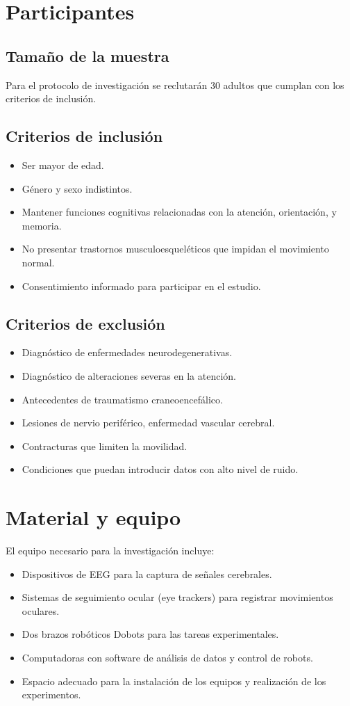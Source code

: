 \documentclass[12pt]{article}
\begin{document}
\section{Participantes}

\subsection{Tamaño de la muestra}
Para el protocolo de investigación se reclutarán 30 adultos que cumplan con los 
criterios de inclusión.

\subsection{Criterios de inclusión}
\begin{itemize}
    \item Ser mayor de edad.
    \item Género y sexo indistintos.
    \item Mantener funciones cognitivas relacionadas con la atención, orientación, y memoria.
    \item No presentar trastornos musculoesqueléticos que impidan el movimiento normal.
    \item Consentimiento informado para participar en el estudio.
\end{itemize}

\subsection{Criterios de exclusión}
\begin{itemize}
    \item Diagnóstico de enfermedades neurodegenerativas.
    \item Diagnóstico de alteraciones severas en la atención.
    \item Antecedentes de traumatismo craneoencefálico.
    \item Lesiones de nervio periférico, enfermedad vascular cerebral.
    \item Contracturas que limiten la movilidad.
    \item Condiciones que puedan introducir datos con alto nivel de ruido.
\end{itemize}

\section{Material y equipo}
El equipo necesario para la investigación incluye:
\begin{itemize}
    \item Dispositivos de EEG para la captura de señales cerebrales.
    \item Sistemas de seguimiento ocular (eye trackers) para registrar movimientos oculares.
    \item Dos brazos robóticos Dobots para las tareas experimentales.
    \item Computadoras con software de análisis de datos y control de robots.
    \item Espacio adecuado para la instalación de los equipos y realización de los experimentos.
\end{itemize}
\end{document}
